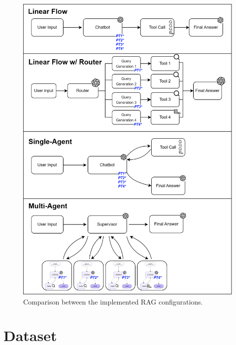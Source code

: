         \begin{figure}[h!]
            \centering
            \includegraphics[width=\textwidth]{images_exp2/diagrams/diagrama_todos.png}
            \caption{Comparison between the implemented RAG configurations.}
            \label{fig:diagrama_todos}
        \end{figure}

    \section{Dataset}

